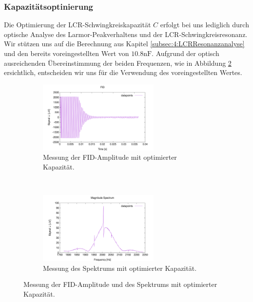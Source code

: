 \documentclass[../../main.tex]{subfiles}
\begin{document}
        \subsubsection*{Kapazitätsoptinierung}\label{subsubsec:5:Kapazitaetsoptimierung}
            Die Optimierung der LCR-Schwingkreiskapazität $C$ erfolgt bei uns lediglich durch optische Analyse des Larmor-Peakverhaltens und der LCR-Schwingkreisresonanz. Wir stützen uns auf die Berechnung aus Kapitel \ref{subsec:4:LCRResonanzanalyse} und den bereits voreingestellten Wert von $10.8\si{\nano\farad}$. Aufgrund der optisch ausreichenden Übereinstimmung der beiden Frequenzen, wie in Abbildung \ref{fig:5:OptiCSpectrum} ersichtlich, entscheiden wir uns für die Verwendung des voreingestellten Wertes.
            \begin{figure}[H]
                \centering
                \begin{subfigure}[t]{0.45\textwidth}
                    \centering
                    \includegraphics[width=6cm]{Bilddateien/5/C_Opti_FID.png}
                    \caption{Messung der FID-Amplitude mit optimierter Kapazität.}
                \end{subfigure}
                \
                \begin{subfigure}[t]{0.45\textwidth}
                    \centering
                    \includegraphics[width=6cm]{Bilddateien/5/C_Opti_Spectrum.png}
                    \caption{Messung des Spektrums mit optimierter Kapazität.}
                    \label{subfig:5:OptiCSpectrum}
                \end{subfigure}
                \caption{Messung der FID-Amplitude und des Spektrums mit optimierter Kapazität.}
                \label{fig:5:OptiCSpectrum}
            \end{figure}
\end{document}
